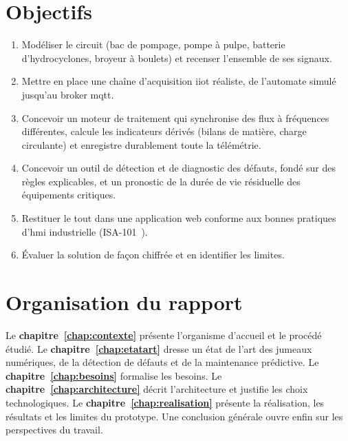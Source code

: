 \section*{Objectifs}
\begin{enumerate}
  \item Modéliser le circuit (bac de pompage, pompe à pulpe, batterie d'hydrocyclones, broyeur à boulets) et recenser l'ensemble de ses signaux.
  \item Mettre en place une chaîne d'acquisition \gls{iiot} réaliste, de l'automate simulé jusqu'au broker \gls{mqtt}.
  \item Concevoir un moteur de traitement qui synchronise des flux à fréquences différentes, calcule les indicateurs dérivés (bilans de matière, charge circulante) et enregistre durablement toute la télémétrie.
  \item Concevoir un outil de détection et de diagnostic des défauts, fondé sur des règles explicables, et un pronostic de la durée de vie résiduelle des équipements critiques.
  \item Restituer le tout dans une application web conforme aux bonnes pratiques d'\gls{hmi} industrielle (ISA-101~\cite{isa101}).
  \item Évaluer la solution de façon chiffrée et en identifier les limites.
\end{enumerate}

\section*{Organisation du rapport}
Le \textbf{chapitre~\ref{chap:contexte}} présente l'organisme d'accueil et le procédé étudié. Le \textbf{chapitre~\ref{chap:etatart}} dresse un état de l'art des jumeaux numériques, de la détection de défauts et de la maintenance prédictive. Le \textbf{chapitre~\ref{chap:besoins}} formalise les besoins. Le \textbf{chapitre~\ref{chap:architecture}} décrit l'architecture et justifie les choix technologiques. Le \textbf{chapitre~\ref{chap:realisation}} présente la réalisation, les résultats et les limites du prototype. Une conclusion générale ouvre enfin sur les perspectives du travail.
